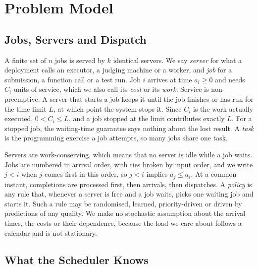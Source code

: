 \providecommand{\devnum}[1]{#1}

\section{Problem Model}
\label{sec:model}

\subsection{Jobs, Servers and Dispatch}

A finite set of $n$ jobs is served by $k$ identical servers. We say \emph{server} for what a
deployment calls an executor, a judging machine or a worker, and \emph{job} for a
submission, a function call or a test run. Job $i$ arrives at time $a_i \ge 0$ and needs
$C_i$ units of service, which we also call its \emph{cost} or its \emph{work}. Service is
non-preemptive. A server that starts a job keeps it until the job finishes or has run for
the time limit $L$, at which point the system stops it. Since $C_i$ is the work actually
executed, $0 < C_i \le L$, and a job stopped at the limit contributes exactly $L$. For a
stopped job, the waiting-time guarantee says nothing about the lost result. A \emph{task}
is the programming exercise a job attempts, so many jobs share one task.

Servers are work-conserving, which means that no server is idle while a job waits. Jobs are
numbered in arrival order, with ties broken by input order, and we write $j < i$ when $j$
comes first in this order, so $j < i$ implies $a_j \le a_i$. At a common instant,
completions are processed first, then arrivals, then dispatches. A \emph{policy} is any
rule that, whenever a server is free and a job waits, picks one waiting job and starts it.
Such a rule may be randomised, learned, priority-driven or driven by predictions of any
quality. We make no stochastic assumption about the arrival times, the costs or their
dependence, because the load we care about follows a calendar and is not stationary.

\subsection{What the Scheduler Knows}

